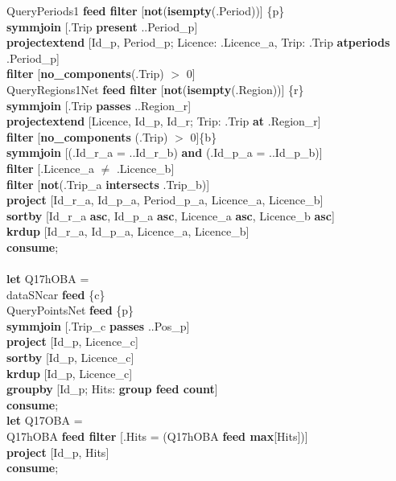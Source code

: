 \documentclass[a4paper]{article}
\newcommand{\op}[1]{\textbf{#1}}
\begin{document}
\begin{scriptsize}
\begin{tabbing}
\>\>QueryPeriods1 \op{feed filter} [\op{not}(\op{isempty}(.Period))] \{p\}\\
\>\>\op{symmjoin} [.Trip \op{present} ..Period\_p]\\
\>\>\>\op{projectextend} [Id\_p, Period\_p; Licence: .Licence\_a, Trip: .Trip \op{atperiods} .Period\_p]\\
\>\>\>\op{filter} [\op{no\_components}(.Trip) $>$ 0]\\
\>\>QueryRegions1Net \op{feed filter} [\op{not}(\op{isempty}(.Region))] \{r\}\\
\>\>\op{symmjoin} [.Trip \op{passes} ..Region\_r]\\
\>\>\>\op{projectextend} [Licence, Id\_p, Id\_r; Trip: .Trip \op{at} .Region\_r]\\
\>\>\>\op{filter} [\op{no\_components} (.Trip) $>$ 0]\{b\}\\
\>\op{symmjoin} [(.Id\_r\_a = ..Id\_r\_b) \op{and} (.Id\_p\_a = ..Id\_p\_b)]\\
\>\op{filter} [.Licence\_a $\neq$ .Licence\_b]\\
\>\op{filter} [\op{not}(.Trip\_a \op{intersects} .Trip\_b)]\\
\>\op{project} [Id\_r\_a, Id\_p\_a, Period\_p\_a, Licence\_a, Licence\_b]\\
\>\op{sortby} [Id\_r\_a \op{asc}, Id\_p\_a \op{asc}, Licence\_a \op{asc}, Licence\_b \op{asc}]\\
\>\op{krdup} [Id\_r\_a, Id\_p\_a, Licence\_a, Licence\_b]\\
\op{consume};\\
\\
\op{let} Q17hOBA =\\
\>dataSNcar \op{feed} \{c\}\\
\>QueryPointsNet \op{feed} \{p\}\\
\>\op{symmjoin} [.Trip\_c \op{passes} ..Pos\_p]\\
\>\op{project} [Id\_p, Licence\_c]\\
\>\op{sortby} [Id\_p, Licence\_c]\\
\>\op{krdup} [Id\_p, Licence\_c]\\
\>\op{groupby} [Id\_p; Hits: \op{group feed count}]\\
\op{consume};\\
\op{let} Q17OBA =\\
\>Q17hOBA \op{feed filter} [.Hits = (Q17hOBA \op{feed max}[Hits])]\\
\>\op{project} [Id\_p, Hits]\\
\op{consume};\\

\end{tabbing}
\end{scriptsize}
\end{document}
